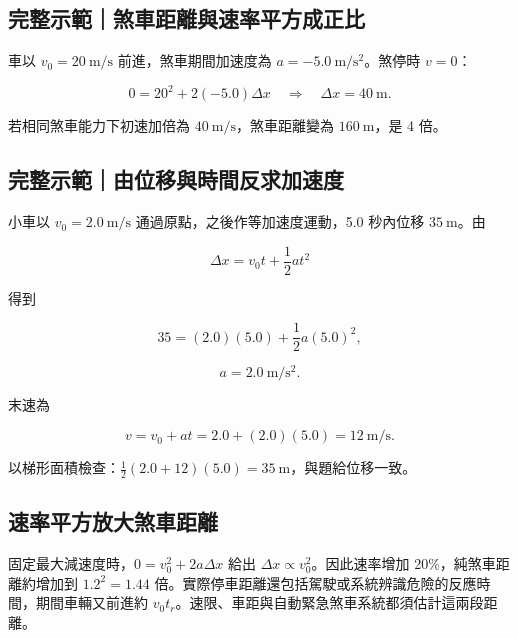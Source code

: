 \documentclass[11pt,a4paper]{article}
\begin{document}
\begin{HandoutWorkedExample}

\subsection{完整示範｜煞車距離與速率平方成正比}\label{ux5b8cux6574ux793aux7bc4ux715eux8ecaux8dddux96e2ux8207ux901fux7387ux5e73ux65b9ux6210ux6b63ux6bd4}

車以 \(v_0=20\ \mathrm{m/s}\) 前進，煞車期間加速度為 \(a=-5.0\ \mathrm{m/s^2}\)。煞停時 \(v=0\)：

\[
0=20^2+2(-5.0)\Delta x
\quad\Rightarrow\quad
\Delta x=40\ \mathrm{m}.
\]

若相同煞車能力下初速加倍為 \(40\ \mathrm{m/s}\)，煞車距離變為 \(160\ \mathrm{m}\)，是 4 倍。

\end{HandoutWorkedExample}

\begin{HandoutWorkedExample}

\subsection{完整示範｜由位移與時間反求加速度}\label{ux5b8cux6574ux793aux7bc4ux7531ux4f4dux79fbux8207ux6642ux9593ux53cdux6c42ux52a0ux901fux5ea6}

小車以 \(v_0=2.0\ \mathrm{m/s}\) 通過原點，之後作等加速度運動，5.0 秒內位移 \(35\ \mathrm m\)。由

\[
\Delta x=v_0t+\frac12at^2
\]

得到

\[
35=(2.0)(5.0)+\frac12a(5.0)^2,
\]

\[
a=2.0\ \mathrm{m/s^2}.
\]

末速為

\[
v=v_0+at=2.0+(2.0)(5.0)=12\ \mathrm{m/s}.
\]

以梯形面積檢查：\(\tfrac12(2.0+12)(5.0)=35\ \mathrm m\)，與題給位移一致。

\end{HandoutWorkedExample}

\subsection{速率平方放大煞車距離}\label{ux901fux7387ux5e73ux65b9ux653eux5927ux715eux8ecaux8dddux96e2}

固定最大減速度時，\(0=v_0^2+2a\Delta x\) 給出 \(\Delta x\propto v_0^2\)。因此速率增加 20\%，純煞車距離約增加到 \(1.2^2=1.44\) 倍。實際停車距離還包括駕駛或系統辨識危險的反應時間，期間車輛又前進約 \(v_0t_r\)。速限、車距與自動緊急煞車系統都須估計這兩段距離。
\end{document}
